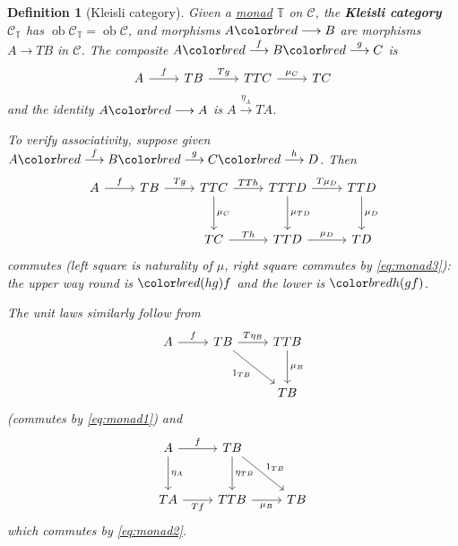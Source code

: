 \documentclass{article}
\makeatletter
\def\mathcolor#1#{\@mathcolor{#1}}
\def\@mathcolor#1#2#3{%
  \protect\leavevmode
  \begingroup
    \color#1{#2}#3%
  \endgroup
}
\newcommand{\green}[1]{\mathcolor{bred}{#1}}
\DeclareMathOperator{\ob}{ob}
\newcommand{\named}[1]{\textbf{#1}\index{#1}}
\let\to\longrightarrow
\newtheorem{ndef}[nthm]{Definition}
\makeatother
\begin{document}
\begin{ndef}[Kleisli category]\label{def:5.5}
  Given a \hyperlink{def:monad}{monad} $\mathbb{T}$ on $\mathscr{C}$, the \named{Kleisli category} $\mathscr{C}_\mathbb{T}$ has $\ob \mathscr{C}_{\mathbb{T}} = \ob \mathscr{C}$, and morphisms $A \green{\to} B$ are morphisms $A \to TB$ in $\mathscr{C}$.
  The composite $A \green{\overset{f}\to} B \green{\overset{g}\to} C$ is
  \begin{equation*}
    \begin{tikzcd}
      A \rar{f} & TB \rar{Tg} & TTC \rar{\mu_C} & TC
    \end{tikzcd}
  \end{equation*}
  and the identity $A \green{\to} A$ is $A \overset{\eta_A}\to TA$.

  To verify associativity, suppose given $A \green{\overset{f}\to} B \green{\overset{g}\to} C \green{\overset{h}\to} D$.
  Then
  \begin{equation*}
    \begin{tikzcd}[row sep=large]
      A \rar{f} & TB \rar{Tg} & TTC \rar{TTh} \dar{\mu_C} & TTTD \dar{\mu_{TD}} \rar{T \mu_D} & TTD \dar{\mu_D} \\
                && TC \rar{Th} & TTD \rar{\mu_D} & TD
    \end{tikzcd}
  \end{equation*}
  commutes (left square is naturality of $\mu$, right square commutes by \eqref{eq:monad3}): the upper way round is $\green{(hg)f}$ and the lower is $\green{h(gf)}$.

  The unit laws similarly follow from
  \begin{equation*}
    \begin{tikzcd}[row sep=large]
    A \rar{f} & TB \rar{T\eta_B} \drar[']{1_{TB}} & TTB \dar{\mu_B}  \\
              && TB
    \end{tikzcd}
  \end{equation*}
  (commutes by \eqref{eq:monad1}) and
  \begin{equation*}
    \begin{tikzcd}[row sep=large]
    A \rar{f} \dar{\eta_A} & TB \drar{1_{TB}} \dar{\eta_{TB}} \\
    TA \rar[']{Tf} & TTB \rar[']{\mu_B} & TB
    \end{tikzcd}
  \end{equation*}
  which commutes by \eqref{eq:monad2}.
\end{ndef}
\printindex
\end{document}
